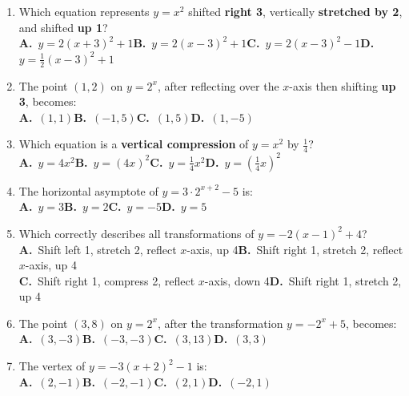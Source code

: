 \documentclass[12pt]{article}
\begin{document}
\begin{enumerate}[label=\textbf{D\arabic*.},leftmargin=*,itemsep=16pt]

\item Which equation represents $y=x^2$ shifted \textbf{right 3}, vertically \textbf{stretched by 2}, and shifted \textbf{up 1}?\\[5pt]
\textbf{A.}\ $y=2(x+3)^2+1$\quad \textbf{B.}\ $y=2(x-3)^2+1$\quad \textbf{C.}\ $y=2(x-3)^2-1$\quad \textbf{D.}\ $y=\tfrac{1}{2}(x-3)^2+1$

\item The point $(1,2)$ on $y=2^x$, after reflecting over the $x$-axis then shifting \textbf{up 3}, becomes:\\[5pt]
\textbf{A.}\ $(1,1)$\qquad \textbf{B.}\ $(-1,5)$\qquad \textbf{C.}\ $(1,5)$\qquad \textbf{D.}\ $(1,-5)$

\item Which equation is a \textbf{vertical compression} of $y=x^2$ by $\tfrac{1}{4}$?\\[5pt]
\textbf{A.}\ $y=4x^2$\qquad \textbf{B.}\ $y=(4x)^2$\qquad \textbf{C.}\ $y=\tfrac{1}{4}x^2$\qquad \textbf{D.}\ $y=\left(\tfrac{1}{4}x\right)^2$

\item The horizontal asymptote of $y=3\cdot2^{x+2}-5$ is:\\[5pt]
\textbf{A.}\ $y=3$\qquad \textbf{B.}\ $y=2$\qquad \textbf{C.}\ $y=-5$\qquad \textbf{D.}\ $y=5$

\item Which correctly describes all transformations of $y=-2(x-1)^2+4$?\\[5pt]
\textbf{A.}\ Shift left 1, stretch 2, reflect $x$-axis, up 4\qquad \textbf{B.}\ Shift right 1, stretch 2, reflect $x$-axis, up 4\\[3pt]
\textbf{C.}\ Shift right 1, compress 2, reflect $x$-axis, down 4\qquad \textbf{D.}\ Shift right 1, stretch 2, up 4

\item The point $(3,8)$ on $y=2^x$, after the transformation $y=-2^x+5$, becomes:\\[5pt]
\textbf{A.}\ $(3,-3)$\qquad \textbf{B.}\ $(-3,-3)$\qquad \textbf{C.}\ $(3,13)$\qquad \textbf{D.}\ $(3,3)$

\item The vertex of $y=-3(x+2)^2-1$ is:\\[5pt]
\textbf{A.}\ $(2,-1)$\qquad \textbf{B.}\ $(-2,-1)$\qquad \textbf{C.}\ $(2,1)$\qquad \textbf{D.}\ $(-2,1)$


\end{enumerate}
\end{document}
